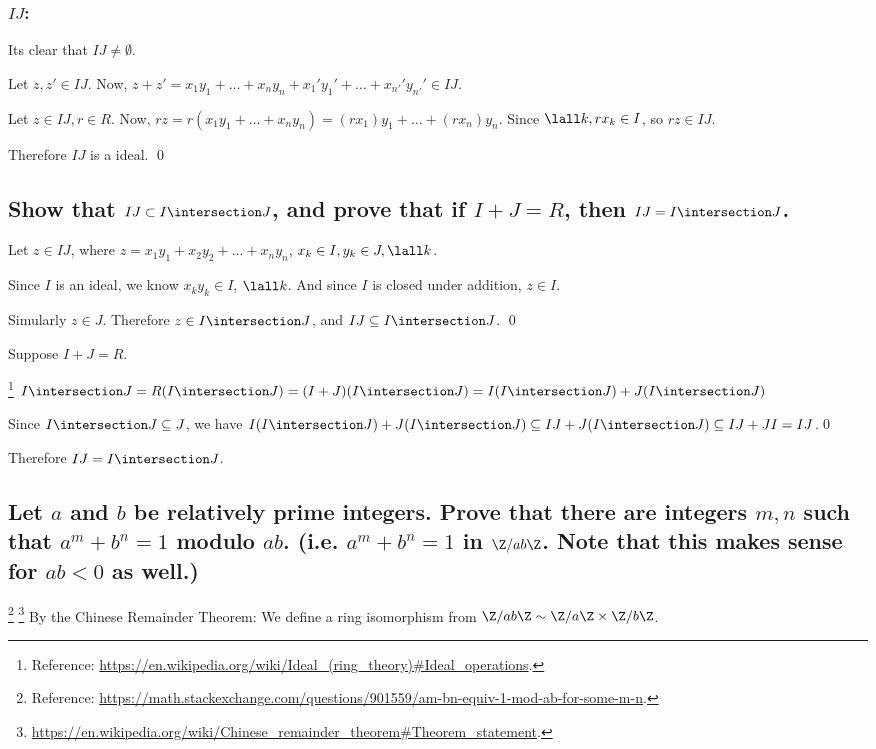 \begin{multicols}{3}
            \subsubsection[Linear Combination]{$IJ$:}

                Its clear that $IJ \neq \emptyset$.

                Let $z, z' \in IJ$.
                Now, $z + z' = x_1y_1 + \hdots + x_ny_n + x_1'y_1' + \hdots + x_{n'}'y_{n'}' \in IJ$.

                Let $z \in IJ, r \in R$.
                Now, $rz = r(x_1y_1 + \hdots + x_ny_n) = (rx_1)y_1 + \hdots + (rx_n)y_n$.
                Since $\lall k, rx_k \in I$, so $rz \in IJ$.

                Therefore $IJ$ is a ideal.
                \qed
        \end{multicols}

    \subsection[(ii)]{Show that $IJ \subset I \intersection J$, and prove that if
        $I+J = R$, then $IJ = I \intersection J$.}
        Let $z \in IJ$, where $z = x_1y_1+ x_2y_2 +\hdots + x_n y_n$, $x_k \in I, y_k \in J, \lall k$.

        Since $I$ is an ideal, we know $x_k y_k \in I$, $\lall k$.
        And since $I$ is closed under addition, $z \in I$.

        Simularly $z \in J$. Therefore $z \in I \intersection J$, and $IJ \subseteq I\intersection J$.
        \qed

        Suppose $I + J = R$.
        
        \footnote{Reference: \url{https://en.wikipedia.org/wiki/Ideal_(ring_theory)\#Ideal_operations}.}
        $I \intersection J = R (I \intersection J) 
            = (I + J) (I \intersection J)
            = I (I\intersection J) + J (I \intersection J)$

            Since $I \intersection J \subseteq J$,
            we have $I (I\intersection J) + J (I \intersection J)
            \subseteq I J + J (I \intersection J)
            \subseteq I J + J I
            = IJ
        $.\qed
        
        Therefore $IJ = I \intersection J$.


    \subsection[(iii)]{Let $a$ and $b$ be relatively prime integers. Prove that 
        there are integers $m,n$ such that $a^m+b^n = 1$ modulo $ab$.
        (i.e. $a^m + b^n = 1$ in $\Z/ab\Z$. Note that this makes sense for $ab < 0$ as well.)
    }
        \footnote{Reference: \url{https://math.stackexchange.com/questions/901559/am-bn-equiv-1-mod-ab-for-some-m-n}.}
        \footnote{\url{https://en.wikipedia.org/wiki/Chinese_remainder_theorem\#Theorem_statement}.}
        By the Chinese Remainder Theorem: 
        We define a ring isomorphism from $\Z/ab\Z \sim \Z/a\Z \times \Z/b\Z$.

